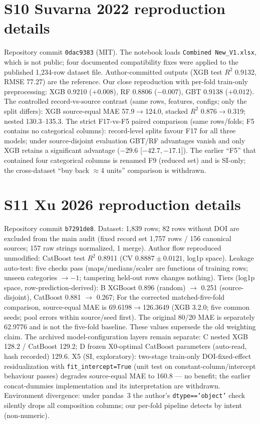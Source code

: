 \documentclass[11pt,a4paper]{article}
\begin{document}
\section{S10 Suvarna 2022 reproduction details}
Repository commit \texttt{0dac9383} (MIT). The notebook loads \texttt{Combined
New\_V1.xlsx}, which is not public; four documented compatibility fixes were applied to
the published 1,234-row dataset file. Author-committed outputs (XGB test $R^2$ 0.9132,
RMSE 77.27) are the reference. Our close reproduction with per-fold train-only
preprocessing: XGB 0.9210 ($+0.008$), RF 0.8806 ($-0.007$), GBT 0.9138 ($+0.012$).
The controlled record-vs-source contrast (same rows, features, configs; only the split
differs): XGB source-equal MAE 57.9$\to$124.0, stacked $R^2$ 0.876$\to$0.319; nested 130.3--135.3. The strict F17-vs-F5 paired comparison (same rows/folds; F5 contains no
categorical columns): record-level splits favour F17 for all three models; under
source-disjoint evaluation GBT/RF advantages vanish and only XGB retains a significant
advantage ($-29.6$ [$-42.7,-17.1$]). The earlier ``F5'' that contained four categorical
columns is renamed F9 (reduced set) and is SI-only; the cross-dataset ``buy back
$\approx4$ units'' comparison is withdrawn.

\section{S11 Xu 2026 reproduction details}
Repository commit \texttt{b7291de8}. Dataset: 1,839 rows; 82 rows without DOI are
excluded from the main audit (fixed record set 1,757 rows / 156 canonical sources;
157 raw strings normalized, 1 merge). Author flow reproduced unmodified: CatBoost test
$R^2$ 0.8911 (CV $0.8887\pm0.0121$, log1p space). Leakage auto-test: five checks pass
(maps/medians/scaler are functions of training rows; unseen categories $\to-1$;
tampering held-out rows changes nothing). Tiers (log1p space, row-prediction-derived):
B XGBoost 0.896 (random) $\to$ 0.251 (source-disjoint), CatBoost 0.881 $\to$ 0.267;
For the corrected matched-five-fold comparison, source-equal MAE is 69.6198$\to$126.3649 (XGB 3.2.0; five common seeds; pool errors within source/seed first). The original 80/20 MAE is separately 62.9776 and is not the five-fold baseline. These values supersede the old weighting claim. The archived model-configuration layers remain separate: C nested XGB 128.2 / CatBoost 129.2; D frozen
X0-optimal CatBoost parameters (auto-read, hash recorded) 129.6. X5 (SI, exploratory):
two-stage train-only DOI-fixed-effect residualization with \texttt{fit\_intercept=True}
(unit test on constant-column/intercept behaviour passes) degrades source-equal MAE to
160.8 --- no benefit; the earlier concat-dummies implementation and its interpretation
are withdrawn. Environment divergence: under pandas~3 the author's
\texttt{dtype=='object'} check silently drops all composition columns; our per-fold
pipeline detects by intent (non-numeric).
\end{document}
